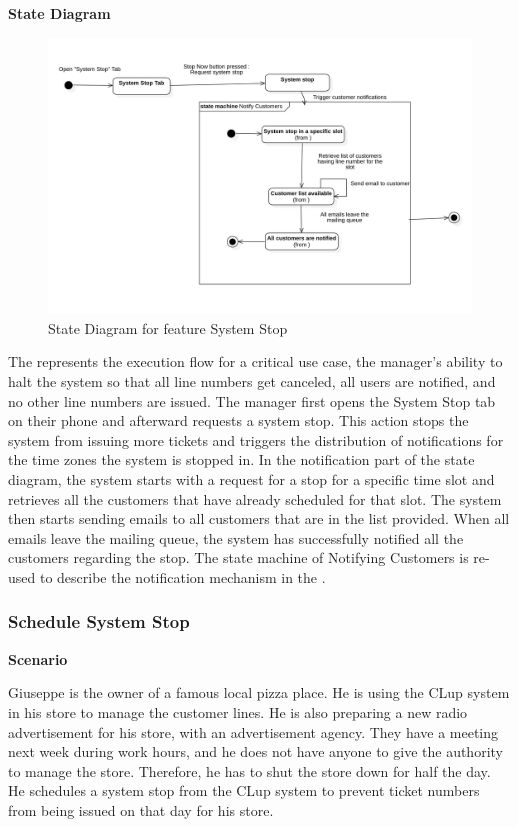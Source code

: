 \textbf{State Diagram}

\begin{figure}[H]
    \centering
    \includegraphics[height=0.4\textwidth]{Images/StateCharts/SystemStop.png}
    \caption{State Diagram for feature System Stop}
    \label{fig:SDSystemStop}
\end{figure}

The  represents the execution flow for a critical use case, the manager's ability to halt the system so that all line numbers get canceled, all users are notified, and no other line numbers are issued.
The manager first opens the System Stop tab on their phone and afterward requests a system stop.
This action stops the system from issuing more tickets and triggers the distribution of notifications for the time zones the system is stopped in.
In the notification part of the state diagram, the system starts with a request for a stop for a specific time slot and retrieves all the customers that have already scheduled for that slot.
The system then starts sending emails to all customers that are in the list provided.
When all emails leave the mailing queue, the system has successfully notified all the customers regarding the stop.
The state machine of Notifying Customers is re-used to describe the notification mechanism in the .

\subsubsection{Schedule System Stop}

\textbf{Scenario}

Giuseppe is the owner of a famous local pizza place.
He is using the CLup system in his store to manage the customer lines.
He is also preparing a new radio advertisement for his store, with an advertisement agency.
They have a meeting next week during work hours, and he does not have anyone to give the authority to manage the store.
Therefore, he has to shut the store down for half the day.
He schedules a system stop from the CLup system to prevent ticket numbers from being issued on that day for his store.

